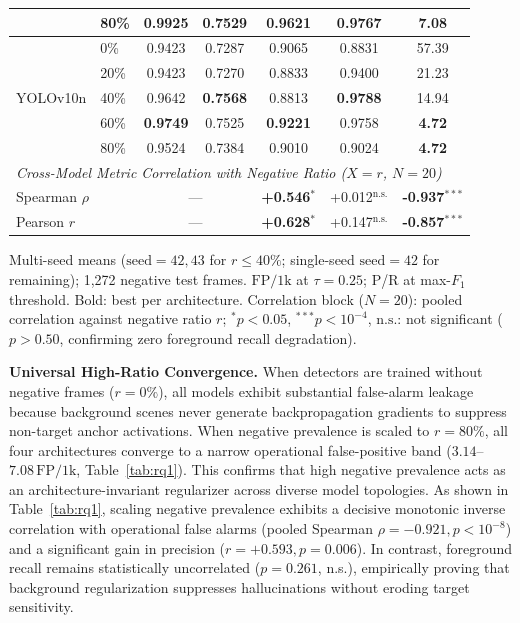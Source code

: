 \documentclass[conference]{IEEEtran}
\begin{document}
\begin{table}[t]
\begin{tabular}{llccccc}
& 80\% & \textbf{0.9925} & 0.7529 & \textbf{0.9621} & 0.9767 & \textbf{7.08} \\
\midrule
\multirow{5}{*}{YOLOv10n}
& 0\%  & 0.9423 & 0.7287 & 0.9065 & 0.8831 & 57.39 \\
& 20\% & 0.9423 & 0.7270 & 0.8833 & 0.9400 & 21.23 \\
& 40\% & 0.9642 & \textbf{0.7568} & 0.8813 & \textbf{0.9788} & 14.94 \\
& 60\% & \textbf{0.9749} & 0.7525 & \textbf{0.9221} & 0.9758 & \textbf{4.72} \\
& 80\% & 0.9524 & 0.7384 & 0.9010 & 0.9024 & \textbf{4.72} \\
\midrule
\multicolumn{7}{l}{\textit{Cross-Model Metric Correlation with Negative Ratio ($X{=}r$, $N{=}20$)}} \\
\midrule
\multicolumn{2}{l}{Spearman $\rho$} & \multicolumn{2}{c}{---} & \textbf{+0.546}$^{*}$ & +0.012$^{\text{n.s.}}$ & \textbf{-0.937}$^{***}$ \\
\multicolumn{2}{l}{Pearson $r$}   & \multicolumn{2}{c}{---} & \textbf{+0.628}$^{*}$ & +0.147$^{\text{n.s.}}$ & \textbf{-0.857}$^{***}$ \\
\bottomrule
\end{tabular}
\vspace{1pt}
{\footnotesize Multi-seed means ($\text{seed}{=}42,43$ for $r \le 40\%$; single-seed $\text{seed}{=}42$ for remaining); 1,272 negative test frames.
$\mathrm{FP/1k}$ at $\tau{=}0.25$; $\mathrm{P}$/$\mathrm{R}$ at max-$F_1$ threshold. Bold: best per architecture. Correlation block ($N{=}20$): pooled correlation against negative ratio $r$; $^{*}p < 0.05$, $^{***}p < 10^{-4}$, $\text{n.s.}$: not significant ($p > 0.50$, confirming zero foreground recall degradation).}
\end{table}

\noindent\textbf{Universal High-Ratio Convergence.}
When detectors are trained without negative frames ($r{=}0\%$), all models exhibit substantial false-alarm leakage because background scenes never generate backpropagation gradients to suppress non-target anchor activations. When negative prevalence is scaled to $r{=}80\%$, all four architectures converge to a narrow operational false-positive band ($3.14$--$7.08\,\mathrm{FP/1k}$, Table~\ref{tab:rq1}). This confirms that high negative prevalence acts as an architecture-invariant regularizer across diverse model topologies. As shown in Table~\ref{tab:rq1}, scaling negative prevalence exhibits a decisive monotonic inverse correlation with operational false alarms (pooled Spearman $\rho = -0.921, p < 10^{-8}$) and a significant gain in precision ($r = +0.593, p = 0.006$). In contrast, foreground recall remains statistically uncorrelated ($p = 0.261$, n.s.), empirically proving that background regularization suppresses hallucinations without eroding target sensitivity.
\end{document}
